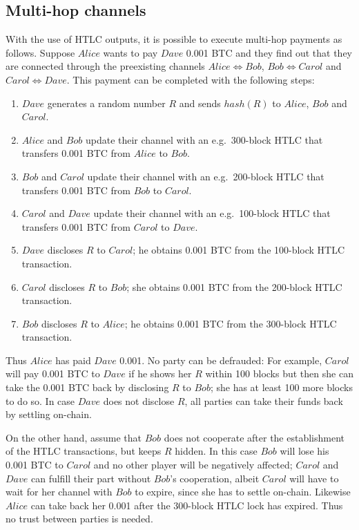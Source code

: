   \subsection{Multi-hop channels}
    With the use of HTLC outputs, it is possible to execute multi-hop payments as follows.
    Suppose $Alice$ wants to pay $Dave$ 0.001 BTC and they find out that they are
    connected through the preexisting channels $Alice \Leftrightarrow Bob$, $Bob
    \Leftrightarrow Carol$ and $Carol \Leftrightarrow Dave$. This payment can be completed
    with the following steps:
    \begin{enumerate}
      \item $Dave$ generates a random number $R$ and sends $hash\left(R\right)$ to
      $Alice$, $Bob$ and $Carol$.
      \item $Alice$ and $Bob$ update their channel with an e.g.\ 300-block HTLC that
      transfers 0.001 BTC from $Alice$ to $Bob$.
      \item $Bob$ and $Carol$ update their channel with an e.g.\ 200-block HTLC that
      transfers 0.001 BTC from $Bob$ to $Carol$.
      \item $Carol$ and $Dave$ update their channel with an e.g.\ 100-block HTLC that
      transfers 0.001 BTC from $Carol$ to $Dave$.
      \item $Dave$ discloses $R$ to $Carol$; he obtains 0.001 BTC from the 100-block HTLC
      transaction.
      \item $Carol$ discloses $R$ to $Bob$; she obtains 0.001 BTC from the 200-block HTLC
      transaction.
      \item $Bob$ discloses $R$ to $Alice$; he obtains 0.001 BTC from the 300-block HTLC
      transaction.
    \end{enumerate}
    Thus $Alice$ has paid $Dave$ 0.001. No party can be defrauded: For example, $Carol$
    will pay 0.001 BTC to $Dave$ if he shows her $R$ within 100 blocks but then she can
    take the 0.001 BTC back by disclosing $R$ to $Bob$; she has at least 100 more blocks
    to do so. In case $Dave$ does not disclose $R$, all parties can take their funds back
    by settling on-chain.

    On the other hand, assume that $Bob$ does not cooperate after the establishment of the
    HTLC transactions, but keeps $R$ hidden. In this case $Bob$ will lose his 0.001 BTC to
    $Carol$ and no other player will be negatively affected; $Carol$ and $Dave$ can
    fulfill their part without $Bob$'s cooperation, albeit $Carol$ will have to wait for
    her channel with $Bob$ to expire, since she has to settle on-chain. Likewise $Alice$
    can take back her 0.001 after the 300-block HTLC lock has expired. Thus no trust
    between parties is needed.


